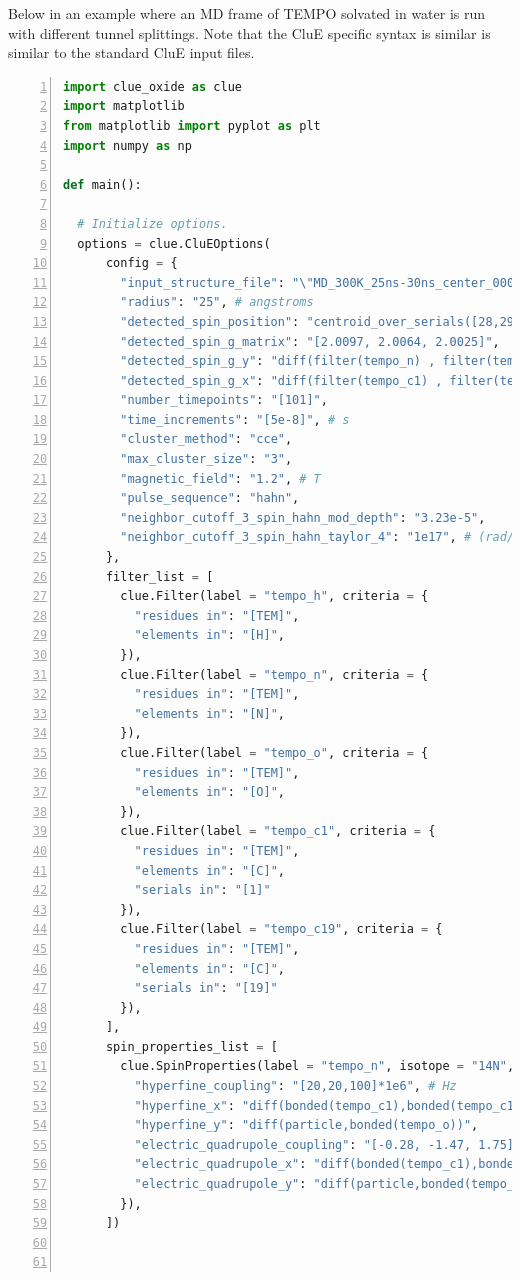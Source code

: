 \documentclass{book}
\begin{document}
Below in an example where an MD frame of TEMPO solvated in water is run with
different tunnel splittings.  
Note that the CluE specific syntax is similar is similar to the standard CluE 
input files. 
\begin{lstlisting}[frame=single,numbers=left,language=python]
import clue_oxide as clue
import matplotlib
from matplotlib import pyplot as plt
import numpy as np

def main():

  # Initialize options.
  options = clue.CluEOptions(
      config = {
        "input_structure_file": "\"MD_300K_25ns-30ns_center_0001.pdb\"",
        "radius": "25", # angstroms
        "detected_spin_position": "centroid_over_serials([28,29])",
        "detected_spin_g_matrix": "[2.0097, 2.0064, 2.0025]",
        "detected_spin_g_y": "diff(filter(tempo_n) , filter(tempo_o) )",
        "detected_spin_g_x": "diff(filter(tempo_c1) , filter(tempo_c19) )",
        "number_timepoints": "[101]",
        "time_increments": "[5e-8]", # s
        "cluster_method": "cce",
        "max_cluster_size": "3",
        "magnetic_field": "1.2", # T
        "pulse_sequence": "hahn",
        "neighbor_cutoff_3_spin_hahn_mod_depth": "3.23e-5",
        "neighbor_cutoff_3_spin_hahn_taylor_4": "1e17", # (rad/s)^4
      },
      filter_list = [
        clue.Filter(label = "tempo_h", criteria = {
          "residues in": "[TEM]",
          "elements in": "[H]",
        }),
        clue.Filter(label = "tempo_n", criteria = {
          "residues in": "[TEM]",
          "elements in": "[N]",
        }),
        clue.Filter(label = "tempo_o", criteria = {
          "residues in": "[TEM]",
          "elements in": "[O]",
        }),
        clue.Filter(label = "tempo_c1", criteria = {
          "residues in": "[TEM]",
          "elements in": "[C]",
          "serials in": "[1]"
        }),
        clue.Filter(label = "tempo_c19", criteria = {
          "residues in": "[TEM]",
          "elements in": "[C]",
          "serials in": "[19]"
        }),
      ],
      spin_properties_list = [
        clue.SpinProperties(label = "tempo_n", isotope = "14N", properties = {
          "hyperfine_coupling": "[20,20,100]*1e6", # Hz
          "hyperfine_x": "diff(bonded(tempo_c1),bonded(tempo_c19))",
          "hyperfine_y": "diff(particle,bonded(tempo_o))",
          "electric_quadrupole_coupling": "[-0.28, -1.47, 1.75]*1e6", # Hz
          "electric_quadrupole_x": "diff(bonded(tempo_c1),bonded(tempo_c19))",
          "electric_quadrupole_y": "diff(particle,bonded(tempo_o))",
        }),
      ])



\end{lstlisting}
\end{document}
